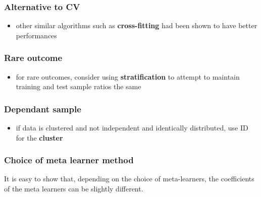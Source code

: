 \documentclass[
]{book}
\newenvironment{Shaded}{\begin{snugshade}}{\end{snugshade}}
\newcommand{\AttributeTok}[1]{\textcolor[rgb]{0.77,0.63,0.00}{#1}}
\newcommand{\FunctionTok}[1]{\textcolor[rgb]{0.00,0.00,0.00}{#1}}
\newcommand{\NormalTok}[1]{#1}
\newcommand{\OtherTok}[1]{\textcolor[rgb]{0.56,0.35,0.01}{#1}}
\newcommand{\SpecialCharTok}[1]{\textcolor[rgb]{0.00,0.00,0.00}{#1}}
\newcommand{\StringTok}[1]{\textcolor[rgb]{0.31,0.60,0.02}{#1}}
\providecommand{\tightlist}{%
  \setlength{\itemsep}{0pt}\setlength{\parskip}{0pt}}
\begin{document}
\hypertarget{alternative-to-cv}{%
\subsubsection{Alternative to CV}\label{alternative-to-cv}}

\begin{itemize}
\tightlist
\item
  other similar algorithms such as \textbf{cross-fitting} had been shown to have better performances
\end{itemize}

\hypertarget{rare-outcome}{%
\subsubsection{Rare outcome}\label{rare-outcome}}

\begin{itemize}
\tightlist
\item
  for rare outcomes, consider using \textbf{stratification} to attempt to maintain training and test sample ratios the same
\end{itemize}

\hypertarget{dependant-sample}{%
\subsubsection{Dependant sample}\label{dependant-sample}}

\begin{itemize}
\tightlist
\item
  if data is clustered and not independent and identically distributed, use ID for the \textbf{cluster}
\end{itemize}

\hypertarget{choice-of-meta-learner-method}{%
\subsubsection{Choice of meta learner method}\label{choice-of-meta-learner-method}}

It is easy to show that, depending on the choice of meta-learners, the coefficients of the meta learners can be slightly different.

\begin{Shaded}
\end{Shaded}
\end{document}

